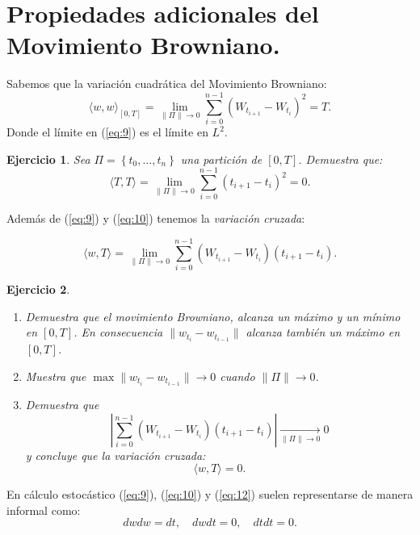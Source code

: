 \documentclass{article}
\newtheorem{ejercicio}{Ejercicio}
\begin{document}
\section{Propiedades adicionales del Movimiento Browniano.}
Sabemos que la variación cuadrática del Movimiento Browniano:
\begin{equation}\label{eq:9}
    \langle w, w\rangle_{[0,T]} = \lim_{\|\Pi\|\rightarrow 0}\sum_{i=0}^{n-1}\left(W_{t_{i+1}}-W_{t_i}\right)^2 = T.
\end{equation}
Donde el límite en (\ref{eq:9}) es el límite en $L^2$.
\begin{ejercicio}
    Sea $\Pi = \left\{t_0, \ldots,t_n\right\}$ una partición de $[0,T]$. Demuestra que:
    \begin{equation}\label{eq:10}
        \langle T, T\rangle = \lim_{\|\Pi\|\rightarrow 0}\sum_{i=0}^{n-1}\left(t_{i+1}-t_i\right)^2 = 0.
    \end{equation}
\end{ejercicio}
Además de (\ref{eq:9}) y (\ref{eq:10}) tenemos la \emph{variación cruzada}:

\begin{equation}\label{eq:11}
    \langle w, T\rangle = \lim_{\|\Pi\|\rightarrow 0}\sum_{i=0}^{n-1}\left(W_{t_{i+1}}-W_{t_i}\right)\left(t_{i+1}-t_i\right) .
\end{equation}
\begin{ejercicio}
    \par\noindent
    \begin{enumerate}
        \item Demuestra que el movimiento Browniano, alcanza un máximo y un mínimo en $[0,T]$. En consecuencia $\|w_{t_i}-w_{t_{i-1}}\|$ alcanza también un máximo en $[0,T]$.
        \item Muestra que $\max \|w_{t_i}-w_{t_{i-1}}\| \rightarrow 0$ cuando $\|\Pi\|\rightarrow 0$.
        \item Demuestra que 
        \begin{equation*}
            \left\vert\sum_{i=0}^{n-1}\left(W_{t_{i+1}}-W_{t_i}\right)\left(t_{i+1}-t_i\right)\right\vert \xrightarrow[\|\Pi\| \to 0]{} 0
        \end{equation*}
        y concluye que la variación cruzada: 
        \begin{equation}\label{eq:12}
            \langle w, T\rangle = 0.
        \end{equation}    
    \end{enumerate}
\end{ejercicio}
En cálculo estocástico (\ref{eq:9}), (\ref{eq:10})  y (\ref{eq:12}) suelen representarse de manera informal como:
$$
dwdw=dt, \quad dwdt = 0,  \quad dtdt = 0.
$$
\end{document}
